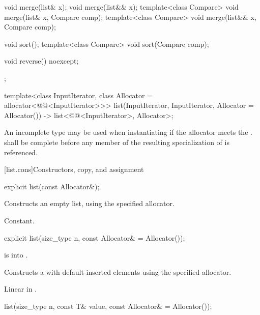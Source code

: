 \begin{codeblock}
{{    void merge(list& x);
    void merge(list&& x);
    template<class Compare> void merge(list& x, Compare comp);
    template<class Compare> void merge(list&& x, Compare comp);

    void sort();
    template<class Compare> void sort(Compare comp);

    void reverse() noexcept;
  };

  template<class InputIterator, class Allocator = allocator<@@<InputIterator>>>
    list(InputIterator, InputIterator, Allocator = Allocator())
      -> list<@@<InputIterator>, Allocator>;
}
\end{codeblock}

\pnum
An incomplete type  may be used when instantiating 
if the allocator meets the
.
 shall be complete before any member of the resulting specialization
of  is referenced.

[list.cons]{Constructors, copy, and assignment}

%
\begin{itemdecl}
explicit list(const Allocator&);
\end{itemdecl}

\begin{itemdescr}
\pnum
\effects
Constructs an empty list, using the specified allocator.

\pnum
\complexity
Constant.
\end{itemdescr}

%
\begin{itemdecl}
explicit list(size_type n, const Allocator& = Allocator());
\end{itemdecl}

\begin{itemdescr}
\pnum
\expects
{} is  into .

\pnum
\effects
Constructs a  with
 default-inserted elements using the specified allocator.

\pnum
\complexity
Linear in
.
\end{itemdescr}

%
\begin{itemdecl}
list(size_type n, const T& value, const Allocator& = Allocator());
\end{itemdecl}

